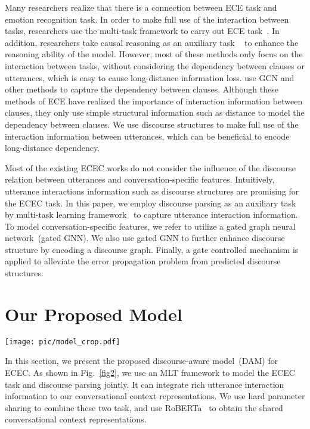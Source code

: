 \documentclass[11pt]{article}
\begin{document}
Many researchers realize that there is a connection between ECE task and emotion recognition task.
In order to make full use of the interaction between tasks, researchers use the multi-task framework to carry out ECE task~\cite{chenJointLearningEmotion2018,wu2020multi}.
In addition, researchers take causal reasoning as an auxiliary task ~\cite{fan2020transition,turcanMultiTaskLearningAdapted2021a} to enhance the reasoning ability of the model.
However, most of these methods only focus on the interaction between tasks, without considering the dependency between clauses or utterances,
which is easy to cause long-distance information loss.
\citet{chen2020end,huFSSGCNGraphConvolutional2021} use GCN and other methods to capture the dependency between clauses.
Although these methods of ECE have realized the importance of interaction information between clauses,
they only use simple structural information such as distance to model the dependency between clauses.
We use discourse structures to make full use of the interaction information between utterances, which can be beneficial to encode long-distance dependency.

Most of the existing ECEC works do not consider the influence of the discourse relation between utterances and conversation-specific features.
Intuitively, utterance interactions information such as discourse structures are promising for the ECEC task.
In this paper, we employ discourse parsing as an auxiliary task by multi-task learning framework~\cite{he2021multi,fan2021multi} to capture utterance interaction information.
To model conversation-specific features, we refer \citet{wang2021structure,gatedgnn2016} to utilize a gated graph neural network~(gated GNN).
We also use gated GNN to further enhance discourse structure by encoding a discourse graph.
Finally, a gate controlled mechanism is applied to alleviate the error propagation problem from predicted discourse structures.

\section{Our Proposed Model}\label{sec:methodlogy}

\begin{figure*}
\centering
\texttt{[image: pic/model\_crop.pdf]}
\caption{Framework of our model.} 
\label{fig2}
\end{figure*}
In this section, we present the proposed discourse-aware model~(DAM) for ECEC.
As shown in Fig.~\ref{fig2}, 
we use an MLT framework to model the ECEC task and discourse parsing jointly. 
It can integrate rich utterance interaction information to our conversational context representations.
We use hard parameter sharing to combine these two task, and use RoBERTa~\cite{liu2019roberta} to obtain the shared conversational context representations.
\end{document}
